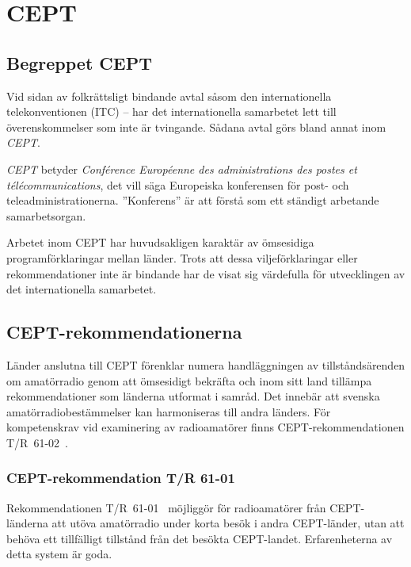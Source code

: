 \section{CEPT}
\label{sec:CEPT}

\subsection{Begreppet CEPT}

Vid sidan av folkrättsligt bindande avtal såsom den internationella
telekonventionen (ITC) -- har det internationella samarbetet lett till
överenskommelser som inte är tvingande.
Sådana avtal görs bland annat inom \emph{CEPT}.

\emph{CEPT} betyder \emph{Conf\'erence Europ\'eenne des administrations des
postes et t\'el\'ecommunications}, det vill säga Europeiska konferensen för
post- och teleadministrationerna.
''Konferens'' är att förstå som ett ständigt arbetande samarbetsorgan.

Arbetet inom CEPT har huvudsakligen karaktär av ömsesidiga programförklaringar
mellan länder.
Trots att dessa viljeförklaringar eller rekommendationer inte är bindande har de
visat sig värdefulla för utvecklingen av det internationella samarbetet.

\subsection{CEPT-rekommendationerna}

Länder anslutna till CEPT förenklar numera handläggningen av
tillståndsärenden om amatörradio genom att ömsesidigt bekräfta och
inom sitt land tillämpa rekommendationer som länderna utformat i
samråd.
Det innebär att svenska amatörradiobestämmelser kan harmoniseras till andra
länders.
För kompetenskrav vid examinering av radioamatörer finns CEPT-rekommendationen
T/R~61-02~\cite{TR6102}.

\subsubsection{CEPT-rekommendation T/R 61-01}

Rekommendationen T/R~61-01~\cite{TR6101} möjliggör för radioamatörer från
CEPT-länderna att utöva amatörradio under korta besök i andra CEPT-länder, utan
att behöva ett tillfälligt tillstånd från det besökta CEPT-landet.
Erfarenheterna av detta system är goda.

